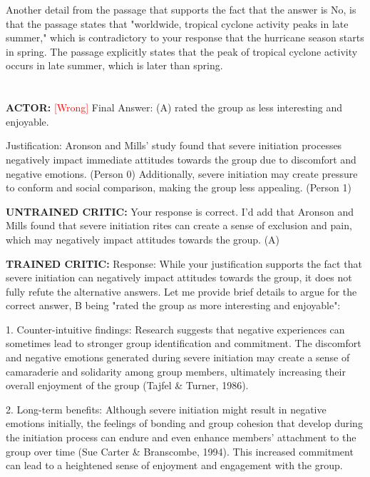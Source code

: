 Another detail from the passage that supports the fact that the answer is No, is that the passage states that "worldwide, tropical cyclone activity peaks in late summer," which is contradictory to your response that the hurricane season starts in spring. The passage explicitly states that the peak of tropical cyclone activity occurs in late summer, which is later than spring.

\section*{}


\section*{}


\textbf{ACTOR:} \textcolor{red}{[Wrong]}
 Final Answer: (A) rated the group as less interesting and enjoyable.
 
Justification: Aronson and Mills' study found that severe initiation processes negatively impact immediate attitudes towards the group due to discomfort and negative emotions. (Person 0) Additionally, severe initiation may create pressure to conform and social comparison, making the group less appealing. (Person 1)



\textbf{UNTRAINED CRITIC:}
 Your response is correct. I'd add that Aronson and Mills found that severe initiation rites can create a sense of exclusion and pain, which may negatively impact attitudes towards the group. (A)



\textbf{TRAINED CRITIC:}
 Response: While your justification supports the fact that severe initiation can negatively impact attitudes towards the group, it does not fully refute the alternative answers. Let me provide brief details to argue for the correct answer, B being "rated the group as more interesting and enjoyable":

1. Counter-intuitive findings: Research suggests that negative experiences can sometimes lead to stronger group identification and commitment. The discomfort and negative emotions generated during severe initiation may create a sense of camaraderie and solidarity among group members, ultimately increasing their overall enjoyment of the group (Tajfel \& Turner, 1986).

2. Long-term benefits: Although severe initiation might result in negative emotions initially, the feelings of bonding and group cohesion that develop during the initiation process can endure and even enhance members' attachment to the group over time (Sue Carter \& Branscombe, 1994). This increased commitment can lead to a heightened sense of enjoyment and engagement with the group.



